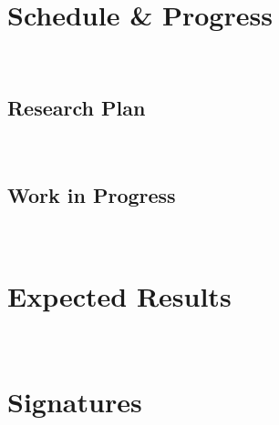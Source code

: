 \section{Schedule \& Progress}\




\subsection{Research Plan}\




\subsection{Work in Progress}\




\section{Expected Results}\




\section{Signatures}\



